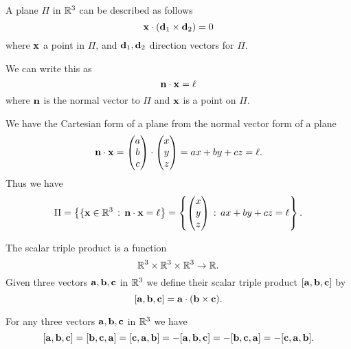 \documentclass[10pt, a4paper]{article}
\begin{document}
\begin{definition}
    A plane $\Pi$ in $\mathbb{R} ^ 3$ can be described as follows
    \[
    \mathbf{x} \cdot (\mathbf{d}_1 \times \mathbf{d}_2) = 0
    \]
    where $\mathbf{x}$ a point in $\Pi$,
    and $\mathbf{d}_1, \mathbf{d}_2$ direction vectors for $\Pi$.

    We can write this as
    \[
    \mathbf{n} \cdot \mathbf{x} = \ell
    \]
    where $\mathbf{n}$ is the normal vector to $\Pi$ and $\mathbf{x}$ is a point on $\Pi$.
\end{definition}

\begin{definition}
    We have the Cartesian form of a plane from the normal vector form of a plane
    \[
    \mathbf{n} \cdot \mathbf{x} = \begin{pmatrix}
        a \\ b \\ c
    \end{pmatrix} \cdot \begin{pmatrix}
        x \\ y \\ z
    \end{pmatrix} = ax + by + cz = \ell.
    \]
    Thus we have
    \[
    \Pi = \left\{\{\mathbf{x} \in \mathbb{R} ^ 3\,:\,\mathbf{n} \cdot \mathbf{x} = \ell\right\} = \left\{\begin{pmatrix}
        x \\ y \\ z
    \end{pmatrix}\,:\, ax + by + cz = \ell\right\}.
    \]
\end{definition}

\begin{definition}
    The scalar triple product is a function
    \[
    \mathbb{R} ^ 3 \times \mathbb{R} ^ 3 \times \mathbb{R} ^ 3 \rightarrow \mathbb{R}.
    \]
    Given three vectors $\mathbf{a, b, c}$ in $\mathbb{R} ^ 3$ we define their scalar triple product $[\mathbf{a, b, c}]$ by
    \[
    [\mathbf{a, b, c}] = \mathbf{a} \cdot(\mathbf{b} \times \mathbf{c}).
    \]
\end{definition}

\begin{lemma}
    For any three vectors $\mathbf{a, b, c}$ in $\mathbb{R} ^ 3$ we have
    \[
    [\mathbf{a, b, c}] = [\mathbf{b, c, a}] = [\mathbf{c, a, b}] = -[\mathbf{a, b, c}] = -[\mathbf{b, c, a}] = -[\mathbf{c, a, b}].
    \]
\end{lemma}

\newpage
\end{document}
